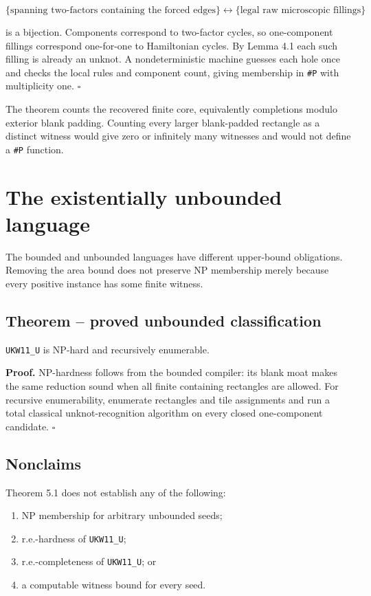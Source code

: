 \documentclass[11pt]{article}
\begin{document}
\[
 \{\text{spanning two-factors containing the forced edges}\}
 \longleftrightarrow
 \{\text{legal raw microscopic fillings}\}
\]

is a bijection.  Components correspond to two-factor cycles, so
one-component fillings correspond one-for-one to Hamiltonian cycles.  By
Lemma 4.1 each such filling is already an unknot.  A nondeterministic machine
guesses each hole once and checks the local rules and component count, giving
membership in \texttt{\#P} with multiplicity one. \hfill$\square$

The theorem counts the recovered finite core, equivalently completions modulo
exterior blank padding.  Counting every larger blank-padded rectangle as a
distinct witness would give zero or infinitely many witnesses and would not
define a \texttt{\#P} function.

\section{The existentially unbounded language}

The bounded and unbounded languages have different upper-bound obligations.
Removing the area bound does not preserve NP membership merely because every
positive instance has some finite witness.

\subsection{Theorem -- proved unbounded classification}

\texttt{UKW11\_U} is NP-hard and recursively enumerable.

\textbf{Proof.}  NP-hardness follows from the bounded compiler: its blank moat makes
the same reduction sound when all finite containing rectangles are allowed.
For recursive enumerability, enumerate rectangles and tile assignments and
run a total classical unknot-recognition algorithm on every closed
one-component candidate. \hfill$\square$

\subsection{Nonclaims}

Theorem 5.1 does not establish any of the following:

\begin{enumerate}
\item NP membership for arbitrary unbounded seeds;
\item r.e.-hardness of \texttt{UKW11\_U};
\item r.e.-completeness of \texttt{UKW11\_U}; or
\item a computable witness bound for every seed.
\end{enumerate}
\end{document}
